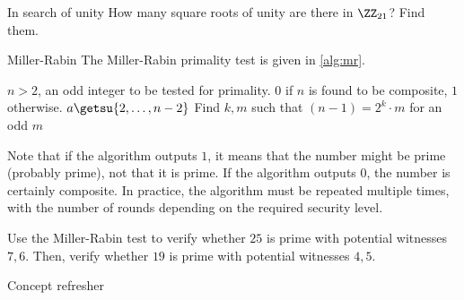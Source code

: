 \documentclass{practice}
\begin{document}
\newpage

\begin{task}{In search of unity}
  How many square roots of unity are there in $\ZZ_{21}$?
  Find them.
\end{task}

\begin{task}{Miller-Rabin}
  The Miller-Rabin primality test is given in \autoref{alg:mr}.

  \renewcommand{\algorithmicrequire}{\textbf{Input:}}
  \renewcommand{\algorithmicensure}{\textbf{Output:}}
  \begin{algorithm}
    \caption{Single round Miller-Rabin test}\label{alg:mr}
  \begin{algorithmic}[1]
    \Require $n > 2$, an odd integer to be tested for primality.
    \Ensure $0$ if $n$ is found to be composite, $1$ otherwise.
    \State $a \getsu \{2, \dots, n - 2\}$
    \EndIf
    \State Find $k, m$ such that $(n-1)=2^k \cdot m$ for an odd $m$ 
    \EndIf
    \EndIf
    \State {}
  \end{algorithmic}
  \end{algorithm}

  Note that if the algorithm outputs $1$, it means that the number might be prime (probably prime), not that it is prime.
  If the algorithm outputs $0$, the number is certainly composite.
  In practice, the algorithm must be repeated multiple times, with the number of rounds depending on the required security level.

  Use the Miller-Rabin test to verify whether $25$ is prime with potential witnesses $7, 6$.
  Then, verify whether $19$ is prime with potential witnesses $4, 5$.
\end{task}

\newpage

\begin{center}
  Concept refresher
\end{center}
\end{document}
